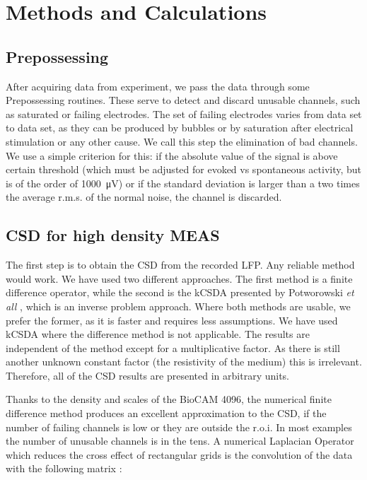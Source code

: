 \documentclass[11pt, letterpaper]{article}
\newcommand{\muV}[1]{\SI{#1}{\micro\volt}}
\begin{document}
\section{Methods and Calculations}

\subsection{Prepossessing}

After acquiring data from experiment, we pass the data through some Prepossessing
routines. These serve to detect and discard unusable channels,
such as saturated or failing electrodes. The
set of failing electrodes varies from data set to data set,
as they can be produced by bubbles or by saturation after electrical stimulation
or any other cause. 
We call this step the elimination of bad channels. We use a simple criterion for this:
if the absolute value of the signal is above certain threshold (which must be
adjusted for evoked vs spontaneous activity, but
is of the order of \muV{1000}) or if the standard deviation is
larger than a two times the average r.m.s.  of the normal noise,
the channel is discarded.


\subsection{CSD for high density MEAS}

The first step is to obtain the CSD from the recorded LFP.
Any reliable method would work.
We have used two different
approaches. The first method is a  finite difference operator,
while the second is the kCSDA presented by
Potworowski \emph{et all} \cite{Potworowski2011},
which is an inverse problem approach.
Where both methods are usable, we prefer the former,
as it is faster and requires less assumptions.
We have used kCSDA where
the difference method is not applicable. The results are
independent of the method except for a multiplicative factor.
As there is still another unknown constant factor
(the resistivity of the medium) this is irrelevant.
Therefore, all of the CSD results are presented in arbitrary units.

Thanks to the density and scales of the BioCAM 4096,
the numerical finite difference method
produces an excellent approximation to the CSD,
if the number of failing channels is low or
they are outside the r.o.i.
In most examples the number  of unusable channels is in the tens.
A  numerical Laplacian Operator which reduces the cross effect of
rectangular grids is the convolution of the data with the following
matrix \cite{Lindberg90}:
\end{document}
